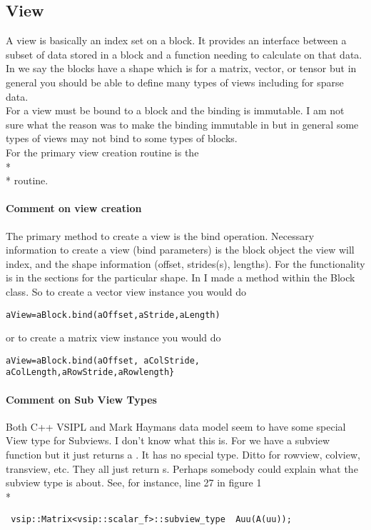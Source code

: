 \subsection{View}
A view is basically an index set on a block. It provides an interface between a subset of data stored in a block and a function needing to calculate on that data.  In \cvl{} we say the blocks have a shape which is for \cvl{} a matrix, vector, or tensor but in general you should be able to define many types of views including for sparse data.
\\[6pt]
For \cvl{} a view must be bound to a block and the binding is immutable. I am not sure what the reason was to make the binding immutable in \cvl{} but in general some types of views may not bind to some types of blocks. \\ 
For \cvl{} the primary view creation routine is the \\*
\\*
routine.
\paragraph{Comment on view creation} The primary method to create a view is the bind operation. Necessary information to create a view (bind parameters) is the block object the view will index, and the shape information (offset, strides(s), lengths). For \cvl{} the  functionality is in the \vw sections for the particular \vw shape. In \pyjv{} I made  a method within the Block class. So to create a vector view instance you would do 
\begin{verbatim}
aView=aBlock.bind(aOffset,aStride,aLength)
\end{verbatim}
or to create a matrix view instance you would do 
\begin{verbatim}
aView=aBlock.bind(aOffset, aColStride, aColLength,aRowStride,aRowlength}
 \end{verbatim}
\paragraph{Comment on Sub View Types} Both C++ VSIPL and Mark Haymans data model seem to have some special View type for Subviews. I don't know what this is. For \cvl{} we have a subview function but it just returns a \vw{}. It has no special type. Ditto for rowview, colview, transview, etc.  They all just return \vw{}s. Perhaps somebody could explain what the subview type is about.  See, for instance, line 27 in figure 1\\*
\begin{verbatim}
 vsip::Matrix<vsip::scalar_f>::subview_type  Auu(A(uu));
 \end{verbatim}